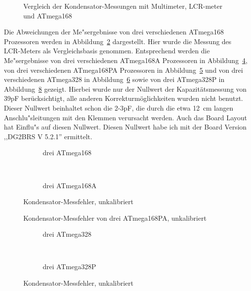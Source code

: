 \begin{figure}[H]
\centering

\caption{Vergleich der Kondensator-Messungen mit Multimeter, LCR-meter und ATmega168}
\label{fig:capcompare}
\end{figure}

Die Abweichungen der Me"sergebnisse von drei verschiedenen ATmega168 Prozessoren werden in Abbildung~\ref{fig:mega168all} dargestellt.
Hier wurde die Messung des LCR-Meters als Vergleichsbasis genommen.
Entsprechend werden die Me"sergebnisse von drei verschiedenen ATmega168A Prozessoren in Abbildung~\ref{fig:mega168Aall}, 
von drei verschiedenen ATmega168PA Prozessoren in Abbildung~\ref{fig:mega168PAall} und von drei verschiedenen
ATmega328 in Abbildung~\ref{fig:mega328all} sowie von drei ATmega328P in Abbildung~\ref{fig:mega328Pall} gezeigt.
Hierbei wurde nur der Nullwert der Kapazit\"atsmessung von 39pF ber\"ucksichtigt, alle anderen Korrekturm\"oglichkeiten wurden
nicht benutzt. Dieser Nullwert beinhaltet schon die 2-3pF, die durch die etwa 12~cm langen Anschlu"sleitungen mit den
Klemmen verursacht werden.
Auch das Board Layout hat Einflu"s auf diesen Nullwert. Diesen Nullwert habe ich mit der Board Version ,,DG2BRS V 5.2.1'' ermittelt.

\begin{figure}[H]
  \begin{subfigure}[b]{9cm}
    \centering
    \resizebox{9cm}{!}{}
    \caption{drei ATmega168}
    \label{fig:mega168all}
  \end{subfigure}
  ~
  \begin{subfigure}[b]{9cm}
    \centering
    \resizebox{9cm}{!}{}
    \caption{drei ATmega168A}
    \label{fig:mega168Aall}
  \end{subfigure}
  \caption{Kondensator-Messfehler, unkalibriert}
\end{figure}

\begin{figure}[H]
\centering

\caption{Kondensator-Messfehler von drei ATmega168PA, unkalibriert}
\label{fig:mega168PAall}
\end{figure}

\begin{figure}[H]
  \begin{subfigure}[b]{9cm}
    \centering
    \resizebox{9cm}{!}{}
    \caption{drei ATmega328}
    \label{fig:mega328all}
  \end{subfigure}
  ~
  \begin{subfigure}[b]{9cm}
    \centering
    \resizebox{9cm}{!}{}
    \caption{drei ATmega328P}
    \label{fig:mega328Pall}
  \end{subfigure}
  \caption{Kondensator-Messfehler, unkalibriert}
\end{figure}

